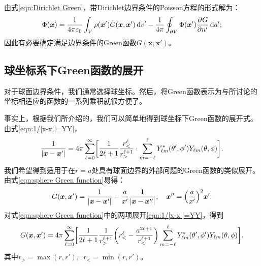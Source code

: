 由式\eqref{eqn:Dirichlet Green}，带Dirichlet边界条件的Poisson方程的形式解为：
\[
    \Phi(\bm x)=\frac1{4\pi\varepsilon_0}\int_V\rho(\bm x')G(\bm x,\bm x')\mathop{}\!\mathrm{d} v'-\frac1{4\pi}\oint_{\partial V}\Phi(\bm x')\frac{\partial^{{}}G}{\partial{n'}^{{}}}\mathop{}\!\mathrm{d} a';
\]
因此有必要确定满足边界条件的Green函数$G(\bm x,\bm x')$。

\subsection{球坐标系下Green函数的展开}
\label{ssec:Green expansion in spherical coordinate}

对于球面边界条件，我们通常选择球坐标。然后，将Green函数表示为与所讨论的坐标相适应的函数的一系列乘积就很方便了。

事实上，根据我们所介绍的，我们可以简单地得到球坐标下Green函数的展开式。由式\eqref{eqn:1/|x-x'|=YY}，
\[
    \frac1{|\bm x-\bm x'|}=4\pi\sum_{\ell=0}^\infty\biggl[\frac1{2\ell+1}\frac{r_<^\ell}{r_>^{\ell+1}}\cdot\sum_{m=-\ell}^\ell Y^\ast_{\ell m}(\theta',\phi')Y_{\ell m}(\theta,\phi)\biggr].
\]
我们希望得到适用于在$r = a$处具有球面边界的外部问题的Green函数的类似展开。由式\eqref{eqn:sphere Green function}易得：
\[
    G(\bm x,\bm x')=\frac1{|\bm x-\bm x'|}-\frac a{x'}\frac1{|\bm x-\bm x''|},\quad\bm x''=\Bigl(\frac{a}{x'}\Bigr)^2\bm x'.
\]
对式\eqref{eqn:sphere Green function}中的两项展开\eqref{eqn:1/|x-x'|=YY}，得到
\begin{equation}
    \label{eqn:Green YY}
    G(\bm x,\bm x')=4\pi\sum_{\ell=0}^\infty\biggl[\frac1{2\ell+1}\frac1{r_>^{\ell+1}}\biggl(r_<^\ell-\frac{a^{2\ell+1}}{r_<^{\ell+1}}\biggr)\sum_{m=-\ell}^\ell Y_{\ell m}^\ast(\theta',\phi')Y_{\ell m}(\theta,\phi)\biggr].
\end{equation}
其中$r_>=\max(r,r'),\enspace r_<=\min(r,r')$。%

